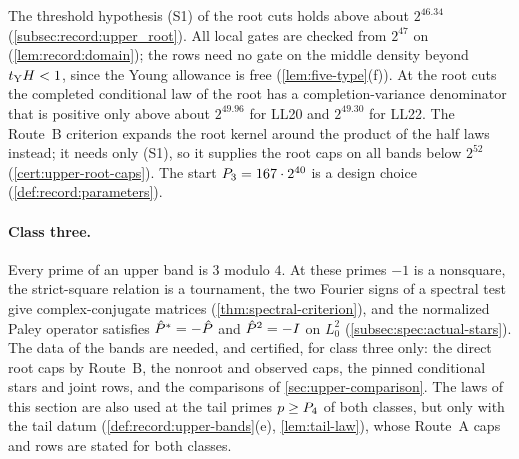 The threshold hypothesis (S1) of the root cuts holds above about $2^{46.34}$
(\cref{subsec:record:upper_root}). All local gates are checked from $2^{47}$ on
(\cref{lem:record:domain}); the rows need no gate on the middle density beyond
$t_{\rm Y}H<1$, since the Young allowance is free (\cref{lem:five-type}(f)). At the
root cuts the completed conditional law of the root has a completion-variance
denominator that is positive only above about $2^{49.96}$ for LL20 and $2^{49.30}$
for LL22. The Route~B criterion expands the root kernel around the
product of the half laws instead; it needs only (S1), so it supplies the root caps
on all bands below $2^{52}$ (\cref{cert:upper-root-caps}). The start
$P_3=167\cdot2^{40}$ is a design choice (\cref{def:record:parameters}).

\paragraph{Class three.} Every prime of an upper band is $3$ modulo $4$. At these
primes $-1$ is a nonsquare, the strict-square relation is a tournament, the two
Fourier signs of a spectral test give complex-conjugate matrices
(\cref{thm:spectral-criterion}), and the normalized Paley operator satisfies
$\hat P^*=-\hat P$ and $\hat P^2=-I$ on $L^2_0$ (\cref{subsec:spec:actual-stars}).
The data of the bands are needed, and certified, for class three only: the direct
root caps by Route~B, the nonroot and observed caps, the pinned conditional stars
and joint rows, and the comparisons of \cref{sec:upper-comparison}. The laws of
this section are also used at the tail primes $p\ge P_4$ of both classes, but
only with the tail datum (\cref{def:record:upper-bands}(e), \cref{lem:tail-law}),
whose Route~A caps and rows are stated for both classes.

